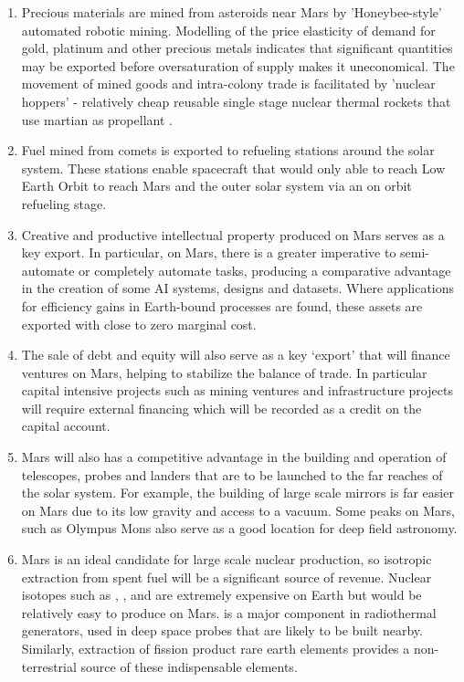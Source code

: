 \documentclass[fleqn,10pt]{Stylesheet} %
\begin{document}
\begin{enumerate}
\item Precious materials are mined from asteroids near Mars by 'Honeybee-style' automated robotic mining. Modelling of the price elasticity of demand for gold, platinum and other precious metals indicates that significant quantities may be exported before oversaturation of supply makes it uneconomical. The movement of mined goods and intra-colony trade is facilitated by 'nuclear hoppers' - relatively cheap reusable single stage nuclear thermal rockets that use martian  as propellant \cite{ZubriN2011}.
\item Fuel mined from comets is exported to refueling stations around the solar system. These stations enable spacecraft that would only able to reach Low Earth Orbit to reach Mars and the outer solar system via an on orbit refueling stage.
\item Creative and productive intellectual property produced on Mars serves as a key export. In particular, on Mars, there is a greater imperative to semi-automate or completely automate tasks, producing a comparative advantage in the creation of some AI systems, designs and datasets. Where applications for efficiency gains in Earth-bound processes are found, these assets are exported with close to zero marginal cost.
\item  The sale of debt and equity will also serve as a key ‘export’ that will finance ventures on Mars, helping to stabilize the balance of trade. In particular capital intensive projects such as mining ventures and infrastructure projects will require external financing which will be recorded as a credit on the capital account.
\item Mars will also has a competitive advantage in the building and operation of telescopes, probes and landers that are to be launched to the far reaches of the solar system. For example, the building of large scale mirrors is far easier on Mars due to its low gravity and access to a vacuum. Some peaks on Mars, such as Olympus Mons also serve as a good location for deep field astronomy.
\item Mars is an ideal candidate for large scale nuclear production, so isotropic extraction from spent fuel will be a significant source of revenue. Nuclear isotopes such as , ,  and  are extremely expensive on Earth but would be relatively easy to produce on Mars.  is a major component in radiothermal generators, used in deep space probes that are likely to be built nearby. Similarly, extraction of fission product rare earth elements provides a non-terrestrial source of these indispensable elements.

\end{enumerate}
\end{document}
